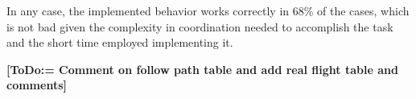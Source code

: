   In any case, the implemented behavior works correctly in 68\% of the cases, which is not bad given the complexity in coordination needed to accomplish the task and the short time employed implementing it.


  \textbf{[ToDo:= Comment on follow path table and add real flight table and comments]}

